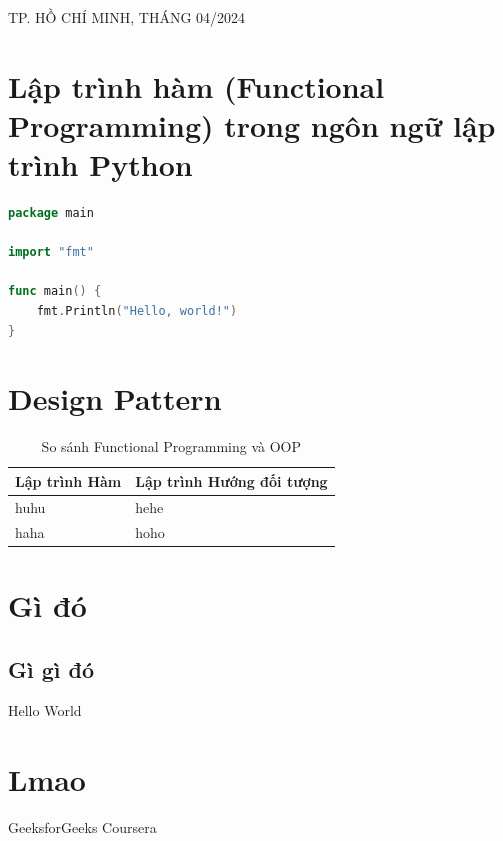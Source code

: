 \begin{titlepage}
\vspace{3cm}

\begin{center}
{\footnotesize TP. HỒ CHÍ MINH, THÁNG 04/2024}
\end{center}
\end{titlepage}



\newpage
\tableofcontents
\newpage


\section {Lập trình hàm (Functional Programming) trong ngôn ngữ lập trình Python}
\begin{lstlisting}[language=Go, caption=Example Go code]
package main

import "fmt"

func main() {
    fmt.Println("Hello, world!")
}
\end{lstlisting}

\section {Design Pattern}
\begin{table}[h]
    \centering
    \begin{tabular}{|p{7cm}|p{7cm}|}
        \hline
        \rowcolor{blue!10}\textbf{Lập trình Hàm} & \textbf{Lập trình Hướng đối tượng} \\
        \hline
        huhu & hehe \\
        \hline
        
        \hline
        haha & hoho  \\
        \hline
    \end{tabular}
    \caption{So sánh Functional Programming và OOP}
    \label{tab:example}
    
\end{table} 

\section{Gì đó}
\subsection{Gì gì đó}
{Hello World}

\section{Lmao}

\newpage
\begin{thebibliography}{80}
GeeksforGeeks
Coursera
\end{thebibliography}
\newpage


